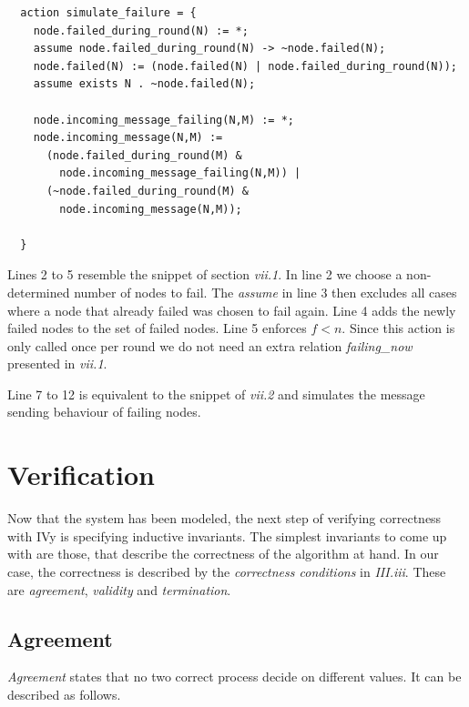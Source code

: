 \documentclass[fleqn]{article}
\begin{document}
\begin{mdframed}[nobreak=true, backgroundcolor=light-gray, roundcorner=10pt,leftmargin=1, rightmargin=1, innerleftmargin=15, innertopmargin=15,innerbottommargin=15, outerlinewidth=1, linecolor=light-gray]
\begin{lstlisting}
  action simulate_failure = {
    node.failed_during_round(N) := *;
    assume node.failed_during_round(N) -> ~node.failed(N);
    node.failed(N) := (node.failed(N) | node.failed_during_round(N));
    assume exists N . ~node.failed(N);

    node.incoming_message_failing(N,M) := *;
    node.incoming_message(N,M) :=
      (node.failed_during_round(M) &
        node.incoming_message_failing(N,M)) |
      (~node.failed_during_round(M) &
        node.incoming_message(N,M));

  }
\end{lstlisting}
\end{mdframed}

Lines 2 to 5 resemble the snippet of section \textit{vii.1}. In line 2 we choose a non-determined number of nodes to fail. The \textit{assume} in line 3 then excludes all cases where a node that already failed was chosen to fail again. Line 4 adds the newly failed nodes to the set of failed nodes. Line 5 enforces $f < n$. Since this action is only called once per round we do not need an extra relation \textit{failing\_now} presented in \textit{vii.1}.

Line 7 to 12 is equivalent to the snippet of \textit{vii.2} and simulates the message sending behaviour of failing nodes.


\section{Verification}

Now that the system has been modeled, the next step of verifying correctness with IVy is specifying inductive invariants. The simplest invariants to come up with are those, that describe the correctness of the algorithm at hand. In our case, the correctness is described by the \textit{correctness conditions} in \textit{III.iii}. These are \textit{agreement}, \textit{validity} and \textit{termination}.

\subsection{Agreement}
\textit{Agreement} states that no two correct process decide on different values. It can be described as follows.
\end{document}
